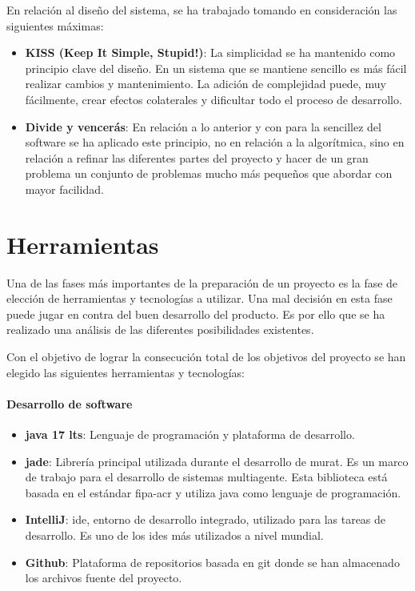 En relación al diseño del sistema, se ha trabajado tomando en consideración las siguientes máximas: 
\begin{itemize}
    \item \textbf{KISS (Keep It Simple, Stupid!)}: La simplicidad se ha mantenido como principio clave del diseño. En un sistema que se mantiene sencillo es más fácil realizar cambios y mantenimiento. La adición de complejidad puede, muy fácilmente, crear efectos colaterales y dificultar todo el proceso de desarrollo.
    \item \textbf{Divide y vencerás}: En relación a lo anterior y con para la sencillez del software se ha aplicado este principio, no en relación a la algorítmica, sino en relación a refinar las diferentes partes del proyecto y hacer de un gran problema un conjunto de problemas mucho más pequeños que abordar con mayor facilidad.
\end{itemize}


\section{Herramientas}
Una de las fases más importantes de la preparación de un proyecto es la fase de elección de herramientas y tecnologías a utilizar. Una mal decisión en esta fase puede jugar en contra del buen desarrollo del producto. Es por ello que se ha realizado una análisis de las diferentes posibilidades existentes.

Con el objetivo de lograr la consecución total de los objetivos del proyecto se han elegido las siguientes herramientas y tecnologías:

\paragraph{Desarrollo de software}
\begin{itemize}
    \item \textbf{\Gls{java} 17 \acrshort{lts}}: Lenguaje de programación y plataforma de desarrollo.
    \item \textbf{\acrshort{jade}}: Librería principal utilizada durante el desarrollo de \acrshort{murat}. Es un marco de trabajo para el desarrollo de sistemas multiagente. Esta biblioteca está basada en el estándar \acrshort{fipa-acr} y utiliza \Gls{java} como lenguaje de programación.
    \item \textbf{IntelliJ}: \acrfull{ide}, entorno de desarrollo integrado, utilizado para las tareas de desarrollo. Es uno de los \acrshort{ide}s más utilizados a nivel mundial.
    \item \textbf{Github}: Plataforma de repositorios basada en \Gls{git} donde se han almacenado los archivos fuente del proyecto.
\end{itemize}

